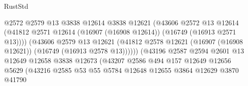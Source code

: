 \begin{lexlean}{RustStd}
\begin{coremodule}
                                          @2572
                                          @2579
                                          @13
                                          @3838
                                          @12614
                                          @3838
                                          @12621
                                          (@43606
                                            @2572
                                            @13
                                            @12614
                                            (@41812
                                              @2571
                                              @12614
                                              (@16907 (@16908 @12614))
                                              (@16749 (@16913 @2571 @13))))
                                          (@43606
                                            @2579
                                            @13
                                            @12621
                                            (@41812
                                              @2578
                                              @12621
                                              (@16907 (@16908 @12621))
                                              (@16749 (@16913 @2578 @13))))))
                                      (@43196
                                        @2587
                                        @2594
                                        @2601
                                        @13
                                        @12649
                                        @12658
                                        @3838
                                        @12673
                                        (@43207
                                          @2586
                                          @494
                                          @157
                                          @12649
                                          @12656
                                          @5629
                                          (@43216
                                            @2585
                                            @53
                                            @55
                                            @5784
                                            @12648
                                            @12655
                                            @3864
                                            @12629
                                            @3870
                                            @41790

\end{coremodule}
\end{lexlean}
